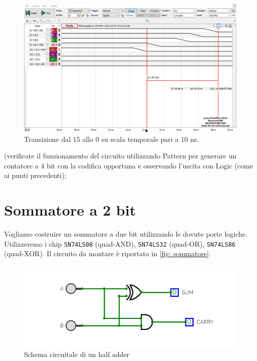 \documentclass[10pt, a4paper, italian]{article}
\begin{document}
\begin{figure}[htbp]
    \centering
    \includegraphics[width=\textwidth]{gray10ns}
    \caption{Transizione dal $15$ allo $0$ su scala temporale pari a $10$ ns.}
\end{figure}
(verificate il funzionamento del circuito utilizzando Pattern per generare un contatore a 4 bit con la codifica opportuna e osservando l’uscita con Logic (come ai punti precedenti);\\


\section{Sommatore a 2 bit}
Vogliamo costruire un sommatore a due bit utilizzando le dovute porte logiche. Utilizzeremo i chip \texttt{SN74LS08} (quad-AND), \texttt{SN74LS32} (quad-OR), \texttt{SN74LS86} (quad-XOR). Il circuito da montare è riportato in \cref{fig: sommatore}.

\begin{figure}[htbp]
    \centering
    \includegraphics[width=0.6\linewidth]{half.png}
    \caption{Schema circuitale di un half adder}
    \label{fig:halfadder}
\end{figure}
\end{document}
